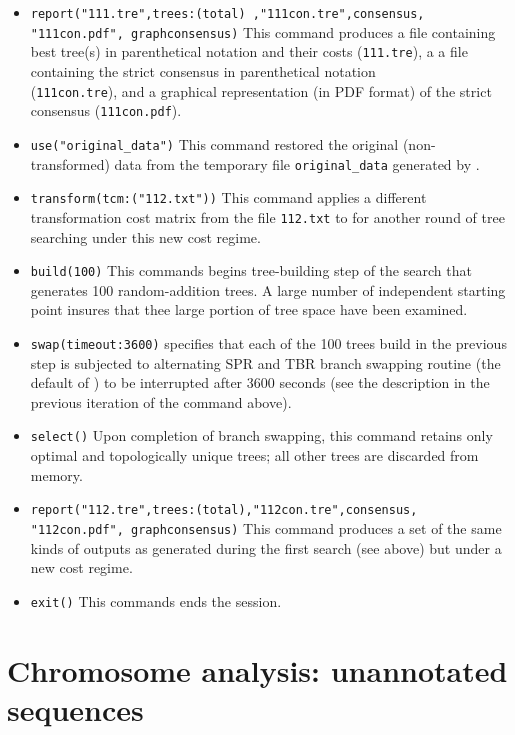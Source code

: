 \begin{itemize}
\item \texttt{report("111.tre",trees:(total) ,"111con.tre",consensus,\\"111con.pdf", graphconsensus)} This command 
produces a file containing best tree(s) in parenthetical notation and their costs (\texttt{111.tre}), a a file containing the 
strict consensus in parenthetical notation \\(\texttt{111con.tre}), and a graphical representation (in PDF format) of the 
strict consensus (\texttt{111con.pdf}).
\item \texttt{use("original\_data")} This command restored the original (non-trans\-formed) data from the temporary file 
\texttt{original\_data} generated by .
\item \texttt{transform(tcm:("112.txt"))} This command applies a different transformation cost matrix from the file 
\texttt{112.txt} to for another round of tree searching under this new cost regime.
\item \texttt{build(100)} This commands begins tree-building step of the search that generates 100 random-addition 
trees. A large number of independent starting point insures that thee large portion of tree space have been 
examined.
\item \texttt{swap(timeout:3600)}  specifies that each of the 100 trees build in the previous step is 
subjected to alternating SPR and TBR branch swapping routine (the default of \poy) to be interrupted after 3600 
seconds (see the description in the previous iteration of the command above).
\item \texttt{select()} Upon completion of branch swapping, this command retains only optimal and topologically 
unique trees; all other trees are discarded from memory.
\item \texttt{report("112.tre",trees:(total),"112con.tre",consensus,\\"112con.pdf", graphconsensus)} This command 
produces a set of the same kinds of outputs as generated during the first search (see above) but under a new cost 
regime.
\item \texttt{exit()} This commands ends the \poy session.
\end{itemize}


\section{Chromosome analysis: unannotated sequences}{\label{tutorial8}}

